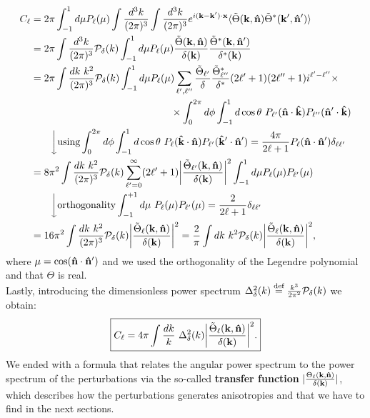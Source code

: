 \begin{align}
    C_{\ell}&=2\pi\int_{-1}^{1}d\mu P_{\ell}(\mu)\int\frac{d^3k}{(2\pi)^3}\int\frac{d^3k}{(2\pi)^3}e^{i(\mathbf k-\mathbf k')\cdot \mathbf x}\langle\tilde\Theta(\mathbf k,\versor n)\tilde\Theta^*(\mathbf k',\versor n')\rangle\nonumber\\
    &=2\pi\int\frac{d^3k}{(2\pi)^3}\mathcal P_{\delta}(k)\int_{-1}^{1}d\mu P_{\ell}(\mu)\frac{\tilde\Theta(\mathbf{k},\versor n)}{\delta(\mathbf{k})}\frac{\tilde\Theta^*(\mathbf{k},\versor n')}{\delta^*(\mathbf{k})}\nonumber\\
    &=2\pi\int\frac{dk\ k^2}{(2\pi)^3}\mathcal P_{\delta}(k)\int_{-1}^{1}d\mu P_{\ell}(\mu)\sum_{\ell',\ell''}\frac{\tilde\Theta_{\ell'}}{\delta}\frac{\tilde\Theta_{\ell''}^*}{\delta^*}(2\ell'+1)(2\ell''+1)i^{\ell'-\ell''}\times\nonumber\\
    &\qquad\qquad\qquad\qquad\qquad\qquad\qquad\times\int_0^{2\pi} d\phi \int_{-1}^{1} d\cos\theta\ P_{\ell'}(\versor n\cdot\versor k)P_{\ell''}(\versor n'\cdot\versor k)\nonumber\\
    &\qquad\bigg\downarrow\text{using}\int_0^{2\pi} d\phi \int_{-1}^{1} d\cos\theta\  P_\ell(\versor{k}\cdot\versor n)P_{\ell'}(\versor{k}'\cdot\versor n')=\frac{4\pi}{2\ell+1}P_\ell(\versor n\cdot\versor n')\delta_{\ell\ell'}\nonumber\\
    &=8\pi^2\int \frac{dk\ k^2}{(2\pi)^3}\mathcal{P}_{\delta}(k)\sum_{\ell'=0}^{\infty}(2\ell'+1)\bigg|\frac{\tilde\Theta_{\ell'}(\mathbf k,\versor n)}{\delta(\mathbf{k})}\bigg|^2\int_{-1}^{1}d\mu P_{\ell}(\mu)P_{\ell'}(\mu)\nonumber\\&\qquad\bigg\downarrow\text{orthogonality}\int_{-1}^{+1}d\mu\ P_\ell(\mu)P_{\ell'}(\mu)=\frac{2}{2\ell+1}\delta_{\ell\ell'}\nonumber\\
    &=16\pi^2\int \frac{dk\ k^2}{(2\pi)^3}\mathcal{P}_{\delta}(k)\bigg|\frac{\tilde\Theta_\ell(\mathbf k,\versor n)}{\delta(\mathbf{k})}\bigg|^2=\frac{2}{\pi}\int dk\ k^2\mathcal{P}_{\delta}(k)\bigg|\frac{\tilde\Theta_\ell(\mathbf k,\versor n)}{\delta(\mathbf{k})}\bigg|^2
    ,\label{eq:cl_pert}
\end{align}
where $\mu=\cos(\mathbf{\hat{n}}\cdot\mathbf{\hat{n}}')$ and we used the orthogonality of the Legendre polynomial and that $\Theta$ is real.\\
Lastly, introducing the dimensionless power spectrum $\Delta^2_{\delta}(k)\stackrel{\text{def}}{=}\frac{k^3}{2\pi^2}\mathcal P_{\delta}(k)$ we obtain:
\begin{equation}
   \boxed{ C_{\ell}=4\pi\int \frac{dk}{k}\ \Delta^2_{\delta}(k)\bigg|\frac{\tilde\Theta_\ell(\mathbf k,\versor n)}{\delta(\mathbf{k})}\bigg|^2.}
\end{equation}
We ended with a formula that relates the angular power spectrum to the power spectrum of the perturbations via the so-called \textbf{transfer function} $|\frac{\Theta_\ell(\mathbf k,\mathbf{\hat{n}})}{\delta(\mathbf{k})}|$, which describes how the perturbations generates anisotropies and that we have to find in the next sections.\\

